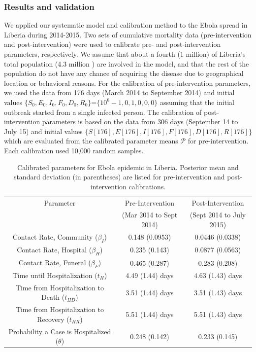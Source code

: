 \subsubsection{Results and validation}
We applied our systematic model and calibration method to the Ebola spread in Liberia during 2014-2015. Two sets of cumulative mortality data (pre-intervention and post-intervention) were used to calibrate pre- and post-intervention parameters, respectively. We assume that about a fourth (1 million) of Liberia's total population (4.3 million \cite{LiberiaPop}) are involved in the model, and that the rest of the population do not have any chance of acquiring the disease due to geographical location or behavioral reasons. For the calibration of pre-intervention parameters, we used the data from 176 days (March 2014 to September 2014) and initial values $\{S_0,E_0,I_0,F_0,D_0,R_0\}$=$\{10^6-1,0,1,0,0,0\}$ assuming that the initial outbreak started from a single infected person. The calibration of post-intervention parameters is based on the data from 306 days (September 14 to July 15) and initial values $\{S[176],E[176],I[176],F[176],D[176],R[176]\}$ which are evaluated from the calibrated parameter means $\mathcal{P}$ for pre-intervention. Each calibration used 10,000 random samples.

\begin{table}[ht]
\centering %
\begin{tabular}{c  c c}
\hline\hline %
Parameter &  Pre-Intervention  & Post-Intervention \\ [0.5ex]
 & (Mar 2014 to Sept 2014) &  (Sept 2014 to July 2015)\\ [0.5ex] %
\hline %
{Contact Rate, Community  (${\beta_{I}}$) }& {0.148 (0.0953)} & {0.0446 (0.0338)}  \\
Contact Rate, Hospital  ($\beta_{H}$) & 0.235 (0.143) & 0.0877 (0.0563) \\
Contact Rate, Funeral  ($\beta_{F}$) & 0.465 (0.287)& 0.283 (0.208) \\
Time until Hospitalization (${t_{H}}$) & 4.49 (1.44) days & 4.63 (1.43) days  \\
Time from Hospitalization to Death (${t_{HD}}$) & 3.51 (1.44) days & 3.51 (1.43) days  \\
Time from Hospitalization to Recovery (${t_{HR}}$) & 5.51 (1.44) days & 5.51 (1.43) days \\
Probability a Case is Hospitalized ($\theta$) & 0.248 (0.142) & 0.233 (0.145) \\
[1ex]
\hline
\end{tabular}
\caption{Calibrated parameters for Ebola epidemic in Liberia. Posterior mean and standard deviation (in parentheses) are listed for pre-intervention and post-intervention calibrations.}%
\label{tab:calibratedParameters}
\end{table}

